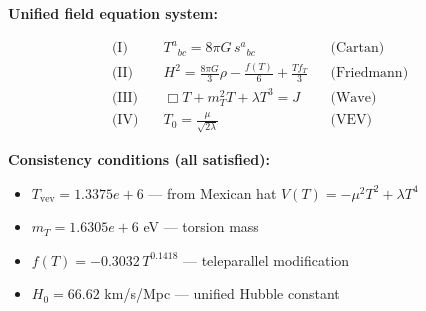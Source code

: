 
\textbf{Unified field equation system:}

\begin{align}
  \text{(I)} \quad & T^a{}_{bc} = 8\pi G \, s^a{}_{bc} && \text{(Cartan)} \\
  \text{(II)} \quad & H^2 = \frac{8\pi G}{3}\rho - \frac{f(T)}{6} + \frac{Tf_T}{3} && \text{(Friedmann)} \\
  \text{(III)} \quad & \Box T + m_T^2 T + \lambda T^3 = J && \text{(Wave)} \\
  \text{(IV)} \quad & T_0 = \frac{\mu}{\sqrt{2\lambda}} && \text{(VEV)}
\end{align}

\textbf{Consistency conditions (all satisfied):}
\begin{itemize}
  \item $T_{\text{vev}} = 1.3375e+6$ — from Mexican hat $V(T) = -\mu^2 T^2 + \lambda T^4$
  \item $m_T = 1.6305e+6$ eV — torsion mass
  \item $f(T) = -0.3032 \, T^{0.1418}$ — teleparallel modification
  \item $H_0 = 66.62$ km/s/Mpc — unified Hubble constant
\end{itemize}